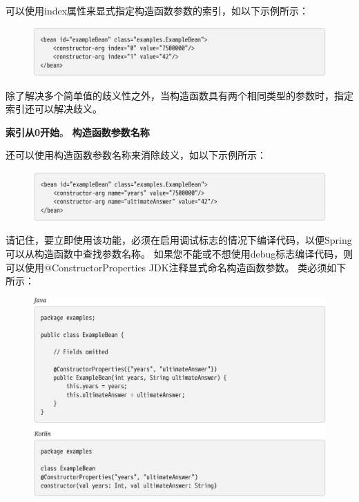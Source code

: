 可以使用index属性来显式指定构造函数参数的索引，如以下示例所示：

\begin{figure}[ht]
    \centering
    \includegraphics[width=1\linewidth]{./Figure/IMG_code_28.png}
\end{figure}

除了解决多个简单值的歧义性之外，当构造函数具有两个相同类型的参数时，指定索引还可以解决歧义。

\textbf{索引从0开始}。
\newpage
\noindent \small{\textbf{构造函数参数名称}}

还可以使用构造函数参数名称来消除歧义，如以下示例所示：

\begin{figure}[ht]
    \centering
    \includegraphics[width=1\linewidth]{./Figure/IMG_code_29.png}
\end{figure}

请记住，要立即使用该功能，必须在启用调试标志的情况下编译代码，以便Spring可以从构造函数中查找参数名称。 如果您不能或不想使用debug标志编译代码，则可以使用@ConstructorProperties JDK注释显式命名构造函数参数。 类必须如下所示：

\begin{figure}[ht]
    \centering
    \includegraphics[width=1\linewidth]{./Figure/IMG_code_30.png}
\end{figure}

